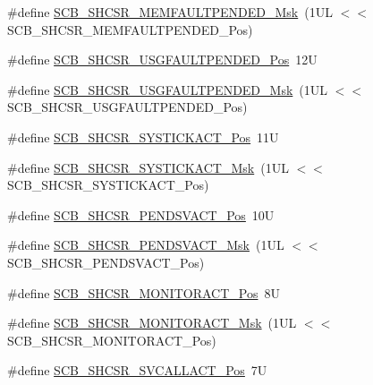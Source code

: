 \begin{DoxyCompactItemize}
\item 
\#define \hyperlink{group___c_m_s_i_s___s_c_b_ga9abc6c2e395f9e5af4ce05fc420fb04c}{S\-C\-B\-\_\-\-S\-H\-C\-S\-R\-\_\-\-M\-E\-M\-F\-A\-U\-L\-T\-P\-E\-N\-D\-E\-D\-\_\-\-Msk}~(1\-U\-L $<$$<$ S\-C\-B\-\_\-\-S\-H\-C\-S\-R\-\_\-\-M\-E\-M\-F\-A\-U\-L\-T\-P\-E\-N\-D\-E\-D\-\_\-\-Pos)
\item 
\#define \hyperlink{group___c_m_s_i_s___s_c_b_ga3cf03acf1fdc2edc3b047ddd47ebbf87}{S\-C\-B\-\_\-\-S\-H\-C\-S\-R\-\_\-\-U\-S\-G\-F\-A\-U\-L\-T\-P\-E\-N\-D\-E\-D\-\_\-\-Pos}~12\-U
\item 
\#define \hyperlink{group___c_m_s_i_s___s_c_b_ga122b4f732732010895e438803a29d3cc}{S\-C\-B\-\_\-\-S\-H\-C\-S\-R\-\_\-\-U\-S\-G\-F\-A\-U\-L\-T\-P\-E\-N\-D\-E\-D\-\_\-\-Msk}~(1\-U\-L $<$$<$ S\-C\-B\-\_\-\-S\-H\-C\-S\-R\-\_\-\-U\-S\-G\-F\-A\-U\-L\-T\-P\-E\-N\-D\-E\-D\-\_\-\-Pos)
\item 
\#define \hyperlink{group___c_m_s_i_s___s_c_b_gaec9ca3b1213c49e2442373445e1697de}{S\-C\-B\-\_\-\-S\-H\-C\-S\-R\-\_\-\-S\-Y\-S\-T\-I\-C\-K\-A\-C\-T\-\_\-\-Pos}~11\-U
\item 
\#define \hyperlink{group___c_m_s_i_s___s_c_b_gafef530088dc6d6bfc9f1893d52853684}{S\-C\-B\-\_\-\-S\-H\-C\-S\-R\-\_\-\-S\-Y\-S\-T\-I\-C\-K\-A\-C\-T\-\_\-\-Msk}~(1\-U\-L $<$$<$ S\-C\-B\-\_\-\-S\-H\-C\-S\-R\-\_\-\-S\-Y\-S\-T\-I\-C\-K\-A\-C\-T\-\_\-\-Pos)
\item 
\#define \hyperlink{group___c_m_s_i_s___s_c_b_ga9b9fa69ce4c5ce7fe0861dbccfb15939}{S\-C\-B\-\_\-\-S\-H\-C\-S\-R\-\_\-\-P\-E\-N\-D\-S\-V\-A\-C\-T\-\_\-\-Pos}~10\-U
\item 
\#define \hyperlink{group___c_m_s_i_s___s_c_b_gae0e837241a515d4cbadaaae1faa8e039}{S\-C\-B\-\_\-\-S\-H\-C\-S\-R\-\_\-\-P\-E\-N\-D\-S\-V\-A\-C\-T\-\_\-\-Msk}~(1\-U\-L $<$$<$ S\-C\-B\-\_\-\-S\-H\-C\-S\-R\-\_\-\-P\-E\-N\-D\-S\-V\-A\-C\-T\-\_\-\-Pos)
\item 
\#define \hyperlink{group___c_m_s_i_s___s_c_b_ga8b71cf4c61803752a41c96deb00d26af}{S\-C\-B\-\_\-\-S\-H\-C\-S\-R\-\_\-\-M\-O\-N\-I\-T\-O\-R\-A\-C\-T\-\_\-\-Pos}~8\-U
\item 
\#define \hyperlink{group___c_m_s_i_s___s_c_b_gaad09b4bc36e9bccccc2e110d20b16e1a}{S\-C\-B\-\_\-\-S\-H\-C\-S\-R\-\_\-\-M\-O\-N\-I\-T\-O\-R\-A\-C\-T\-\_\-\-Msk}~(1\-U\-L $<$$<$ S\-C\-B\-\_\-\-S\-H\-C\-S\-R\-\_\-\-M\-O\-N\-I\-T\-O\-R\-A\-C\-T\-\_\-\-Pos)
\item 
\#define \hyperlink{group___c_m_s_i_s___s_c_b_ga977f5176be2bc8b123873861b38bc02f}{S\-C\-B\-\_\-\-S\-H\-C\-S\-R\-\_\-\-S\-V\-C\-A\-L\-L\-A\-C\-T\-\_\-\-Pos}~7\-U
$$
\end{DoxyCompactItemize}
